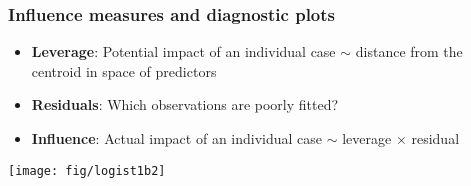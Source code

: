 \renewcommand{\FileName}{loginfl}
\begin{frame}
  \frametitle{Influence measures and diagnostic plots}
  \begin{itemize}
	\item{\large\bfseries Leverage}: Potential impact of an individual case $\sim$ distance
	from the centroid in space of predictors
	\item{\large\bfseries Residuals}: Which observations are poorly fitted? 
	\item{\large\bfseries Influence}: Actual impact of an individual case $\sim$ leverage $\times$ residual
  \end{itemize}
 \begin{center}
  \texttt{[image: fig/logist1b2]}
 \end{center}
\end{frame}

